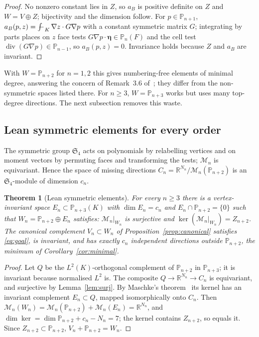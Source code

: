 \documentclass[11pt,a4paper]{article}
\newtheorem{theorem}{Theorem}[section]
\theoremstyle{definition}
\theoremstyle{remark}
\newcommand{\M}{\mathcal M}
\newcommand{\avg}{\mathop{\mathchoice{{\textstyle\int}\mkern-15.5mu{-}\mkern2mu}{\int\mkern-12mu{-}\mkern1mu}{\int\mkern-11mu{-}}{\int\mkern-11mu{-}}}\nolimits}
\newcommand{\Pol}{\mathbb P}
\begin{document}
\begin{proof}
No nonzero constant lies in \(Z\), so \(a_B\) is positive definite on \(Z\)
and \(W=V\oplus Z\); bijectivity and the dimension follow. For
\(p\in\Pol_{n+1}\), \(a_B(p,z)=\avg_K\nabla z\cdot G\nabla p\) with a constant
symmetric matrix \(G\); integrating by parts places on \(z\) face tests
\(G\nabla p\cdot\boldsymbol\eta\in\Pol_n(F)\) and the cell test
\(\operatorname{div}(G\nabla p)\in\Pol_{n-1}\), so \(a_B(p,z)=0\). Invariance
holds because \(Z\) and \(a_B\) are invariant.
\end{proof}

With \(W=\Pol_{n+2}\) for \(n=1,2\) this gives numbering-free elements of
minimal degree, answering the concern of Remark~3.6 of~\cite{BAJO2025};
they differ from the non-symmetric spaces listed there. For \(n\ge3\),
\(W=\Pol_{n+3}\) works but uses many top-degree directions. The next
subsection removes this waste.

\subsection{Lean symmetric elements for every order}

The symmetric group \(\mathfrak S_4\) acts on polynomials by relabelling
vertices and on moment vectors by permuting faces and transforming the
tests; \(\M_n\) is equivariant. Hence the space of missing directions
\(C_n=\mathbb R^{N_n}/\M_n(\Pol_{n+2})\) is an \(\mathfrak S_4\)-module of
dimension \(c_n\).

\begin{theorem}[Lean symmetric elements]
\label{thm:lean}
For every \(n\ge3\) there is a vertex-invariant space \(E_n\subset\Pol_{n+3}(K)\)
with \(\dim E_n=c_n\) and \(E_n\cap\Pol_{n+2}=\{0\}\) such that
\(W_n=\Pol_{n+2}\oplus E_n\) satisfies: \(\M_n|_{W_n}\) is surjective and
\(\ker(\M_n|_{W_n})=Z_{n+2}\). The canonical complement \(V_n\subset W_n\) of
Proposition~\ref{prop:canonical} satisfies \eqref{eq:goal}, is invariant,
and has exactly \(c_n\) independent directions outside \(\Pol_{n+2}\), the
minimum of Corollary~\ref{cor:minimal}.
\end{theorem}

\begin{proof}
Let \(Q\) be the \(L^2(K)\)-orthogonal complement of \(\Pol_{n+2}\) in
\(\Pol_{n+3}\); it is invariant because normalised \(L^2\) is. The composite
\(Q\to\mathbb R^{N_n}\to C_n\) is equivariant, and surjective by
Lemma~\ref{lem:surj}. By Maschke's theorem~\cite{Serre1977} its kernel has
an invariant complement \(E_n\subset Q\), mapped isomorphically onto \(C_n\).
Then \(\M_n(W_n)=\M_n(\Pol_{n+2})+\M_n(E_n)=\mathbb R^{N_n}\), and
\(\dim\ker=\dim\Pol_{n+2}+c_n-N_n=7\); the kernel contains \(Z_{n+2}\), so equals
it. Since \(Z_{n+2}\subset\Pol_{n+2}\), \(V_n+\Pol_{n+2}=W_n\).
\end{proof}
\end{document}
